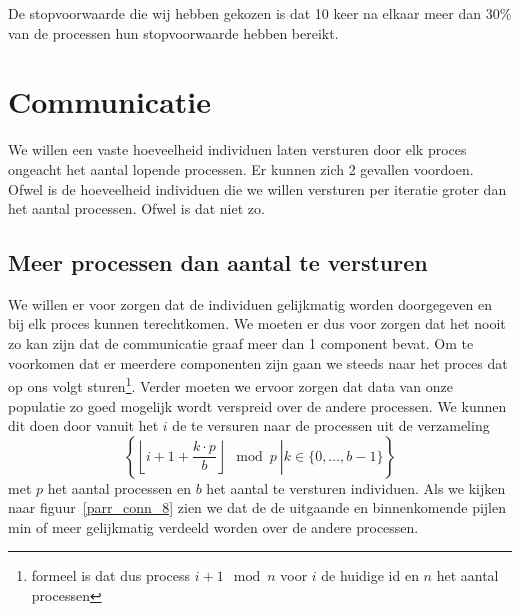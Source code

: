 De stopvoorwaarde die wij hebben gekozen is dat 10 keer na elkaar meer dan 30\% van de processen hun stopvoorwaarde hebben bereikt.

\section{Communicatie}
\label{sub:parCommWay}
We willen een vaste hoeveelheid individuen laten versturen door elk proces ongeacht het aantal lopende processen.  
Er kunnen zich 2 gevallen voordoen. Ofwel is de hoeveelheid individuen die we willen versturen per iteratie groter dan het aantal processen. Ofwel is dat niet zo.
\subsection{Meer processen dan aantal te versturen}
We willen er voor zorgen dat de individuen gelijkmatig worden doorgegeven en bij
elk proces kunnen terechtkomen. We moeten er dus voor zorgen dat het nooit zo kan zijn dat de communicatie graaf meer dan 1 component bevat. Om te voorkomen dat er meerdere componenten zijn gaan we steeds naar het proces dat op ons volgt sturen\footnote{formeel is dat dus process $i+1 \mod n$ voor $i$ de huidige id en $n$ het aantal processen}. Verder moeten we ervoor zorgen dat data van onze populatie zo goed mogelijk wordt verspreid over de andere processen. We kunnen dit doen door vanuit het $i$ de te versuren naar de processen uit de verzameling \[
\left\{\left.\left\lfloor i + 1 + \frac{k \cdot p}{b}\right\rfloor \mod p  ~ \right\rvert   k \in \{0,\dots,b-1\}\right\}
\] met $p$ het aantal processen en $b$ het aantal te versturen individuen. Als we kijken naar figuur~\ref{parr_conn_8} zien we dat de de uitgaande en binnenkomende pijlen min of meer gelijkmatig verdeeld worden over de andere processen. 

